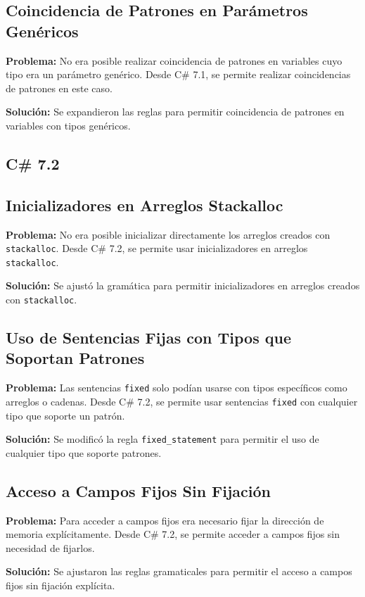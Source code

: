 \subsection*{Coincidencia de Patrones en Parámetros Genéricos}
\textbf{Problema:} No era posible realizar coincidencia de patrones en variables cuyo tipo era un parámetro genérico. Desde C\# 7.1, se permite realizar coincidencias de patrones en este caso.

\textbf{Solución:} Se expandieron las reglas para permitir coincidencia de patrones en variables con tipos genéricos.


\subsection*{C\# 7.2}

\subsection*{Inicializadores en Arreglos Stackalloc}
\textbf{Problema:} No era posible inicializar directamente los arreglos creados con \texttt{stackalloc}. Desde C\# 7.2, se permite usar inicializadores en arreglos \texttt{stackalloc}.

\textbf{Solución:} Se ajustó la gramática para permitir inicializadores en arreglos creados con \texttt{stackalloc}.

\subsection*{Uso de Sentencias Fijas con Tipos que Soportan Patrones}
\textbf{Problema:} Las sentencias \texttt{fixed} solo podían usarse con tipos específicos como arreglos o cadenas. Desde C\# 7.2, se permite usar sentencias \texttt{fixed} con cualquier tipo que soporte un patrón.

\textbf{Solución:} Se modificó la regla \texttt{fixed\_statement} para permitir el uso de cualquier tipo que soporte patrones.

\subsection*{Acceso a Campos Fijos Sin Fijación}
\textbf{Problema:} Para acceder a campos fijos era necesario fijar la dirección de memoria explícitamente. Desde C\# 7.2, se permite acceder a campos fijos sin necesidad de fijarlos.

\textbf{Solución:} Se ajustaron las reglas gramaticales para permitir el acceso a campos fijos sin fijación explícita.

